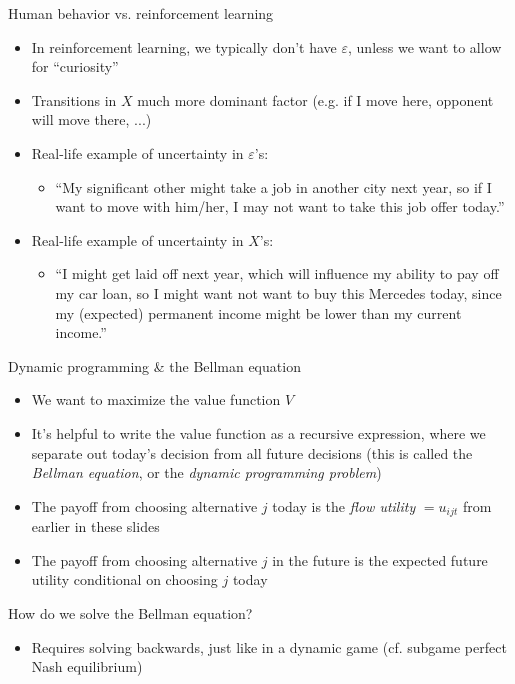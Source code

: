 \documentclass[english,aspectratio=169,12pt,xcolor=dvipsnames]{beamer}
\begin{document}
\begin{frame}{Human behavior vs. reinforcement learning}
\begin{itemize}
\item In reinforcement learning, we typically don't have $\varepsilon$, unless we want to allow for ``curiosity''
\item Transitions in $X$ much more dominant factor (e.g. if I move here, opponent will move there, ...)
\item Real-life example of uncertainty in $\varepsilon$'s:
    \begin{itemize}
        \item ``My significant other might take a job in another city next year, so if I want to move with him/her, I may not want to take this job offer today.''
    \end{itemize}
\item Real-life example of uncertainty in $X$'s:
    \begin{itemize}
        \item ``I might get laid off next year, which will influence my ability to pay off my car loan, so I might want not want to buy this Mercedes today, since my (expected) permanent income might be lower than my current income.''
    \end{itemize}
\end{itemize}
\end{frame}




\begin{frame}{Dynamic programming \& the Bellman equation}
\begin{itemize}
\item We want to maximize the value function $V$
\item It's helpful to write the value function as a recursive expression, where we separate out today's decision from all future decisions (this is called the \emph{Bellman equation}, or the \emph{dynamic programming problem})
\item The payoff from choosing alternative $j$ today is the \emph{flow utility} $= u_{ijt}$ from earlier in these slides
\item The payoff from choosing alternative $j$ in the future is the expected future utility conditional on choosing $j$ today
\end{itemize}
How do we solve the Bellman equation?
\begin{itemize}
\item Requires solving backwards, just like in a dynamic game (cf. subgame perfect Nash equilibrium)
\end{itemize}
\end{frame}
\end{document}
